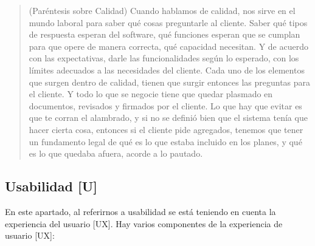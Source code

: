 \begin{quote}
(Paréntesis sobre Calidad) Cuando hablamos de calidad, nos sirve en el
mundo laboral para saber qué cosas preguntarle al cliente. Saber qué
tipos de respuesta esperan del software, qué funciones esperan que se
cumplan para que opere de manera correcta, qué capacidad necesitan. Y de
acuerdo con las expectativas, darle las funcionalidades según lo
esperado, con los límites adecuados a las necesidades del cliente. Cada
uno de los elementos que surgen dentro de calidad, tienen que surgir
entonces las preguntas para el cliente. Y todo lo que se negocie tiene
que quedar plasmado en documentos, revisados y firmados por el cliente.
Lo que hay que evitar es que te corran el alambrado, y si no se definió
bien que el sistema tenía que hacer cierta cosa, entonces si el cliente
pide agregados, tenemos que tener un fundamento legal de qué es lo que
estaba incluido en los planes, y qué es lo que quedaba afuera, acorde a
lo pautado.
\end{quote}

\hypertarget{usabilidad-u}{%
\subsection{Usabilidad {[}U{]}}\label{usabilidad-u}}

En este apartado, al referirnos a usabilidad se está teniendo en cuenta
la experiencia del usuario {[}UX{]}. Hay varios componentes de la
experiencia de usuario {[}UX{]}:

